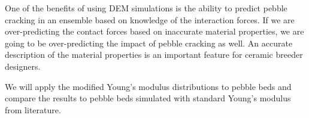 




One of the benefits of using DEM simulations is the ability to predict pebble cracking in an ensemble based on knowledge of the interaction forces. If we are over-predicting the contact forces based on inaccurate material properties, we are going to be over-predicting the impact of pebble cracking as well. An accurate description of the material properties is an important feature for ceramic breeder designers.

We will apply the modified Young's modulus distributions to pebble beds and compare the results to pebble beds simulated with standard Young's modulus from literature.

